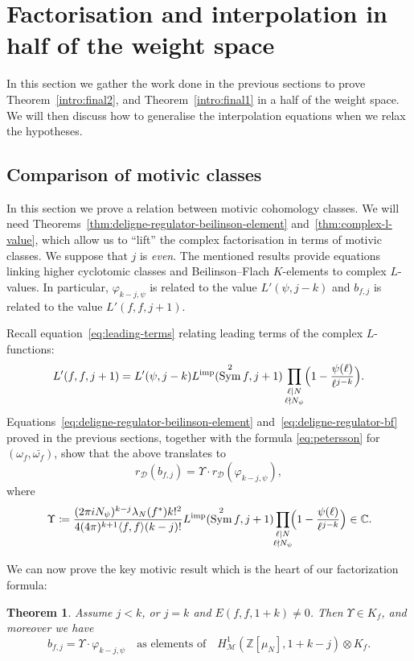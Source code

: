 \documentclass[11pt, a4paper, reqno]{amsart}
\theoremstyle{definition}
\theoremstyle{plain}
\newtheorem{theorem}[definition]{Theorem}
\theoremstyle{remark}
\DeclareMathOperator{\Sym}{Sym}
\DeclareMathOperator{\mot}{\mathscr{M}}
\newcommand{\numberset}{\mathbb}
\newcommand{\C}{\numberset{C}}
\newcommand{\Z}{\numberset{Z}}
\renewcommand{\phi}{\varphi}
\newcommand{\del}{\mathcal{D}}
\newcommand{\regulator}[1]{r_{#1}}
\newcommand{\rD}{\regulator{\del}}
\newcommand{\Limp}{L^{\mathrm{imp}}}
\begin{document}
\section{Factorisation and interpolation in half of the weight space}
 \label{sec:comparison}
 
 In this section we gather the work done in the previous sections to prove Theorem~\ref{intro:final2}, and Theorem~\ref{intro:final1} in a half of the weight space. We will then discuss how to generalise the interpolation equations when we relax the hypotheses.

 \subsection{Comparison of motivic classes}

  In this section we prove a relation between motivic cohomology classes. We will need Theorems~\ref{thm:deligne-regulator-beilinson-element} and~\ref{thm:complex-l-value}, which allow us to ``lift'' the complex factorisation in terms of motivic classes. We suppose that $j$ is \emph{even}. The mentioned results provide equations linking higher cyclotomic classes and Beilinson--Flach $K$-elements to complex $L$-values. In particular, $\phi_{k-j, \psi}$ is related to the value $L'(\psi,j-k)$ and $b_{f, j}$ is related to the value $L'(f,f,j+1)$.

  Recall equation~\eqref{eq:leading-terms} relating leading terms of the complex $L$-functions:
  \[
   L'(f,f,j+1) = L'(\psi,j-k)\Limp(\Sym^2 f,j+1)
   \prod_{\substack{\ell \mid N \\ \ell \nmid N_{\psi}}} \Bigl(1 - \frac{\psi(\ell)}{\ell^{j-k}} \Bigr).
  \]
  Equations~\eqref{eq:deligne-regulator-beilinson-element} and~\eqref{eq:deligne-regulator-bf} proved in the previous sections, together with the formula \eqref{eq:petersson} for $(\omega_f, \bar{\omega_f})$, show that the above translates to
  \[ \rD(b_{f, j}) = \Upsilon \cdot \rD(\phi_{k-j, \psi}), \]
  where
  \[ 
   \Upsilon \coloneqq  \frac{(2\pi i N_\psi)^{k-j} \lambda_N(f^*) k!^2}{4 (4\pi)^{k+1} \langle f, f \rangle (k-j)!}\Limp(\Sym^2 f,j+1)\smashoperator{\prod_{\substack{\ell \mid N \\ \ell \nmid N_{\psi}}}} \Bigl(1 - \frac{\psi(\ell)}{\ell^{j-k}}\Bigr) \in \C.
  \]
 
  We can now prove the key motivic result which is the heart of our factorization formula:
  \begin{theorem}
   \label{thm:motivic-relation}
   Assume $j < k$, or $j = k$ and $E(f, f, 1 + k) \ne 0$. Then $\Upsilon \in K_f$, and moreover we have
   \[ b_{f, j} = \Upsilon \cdot \phi_{k-j, \psi}\quad \text{as elements of}\quad H^1_{\mot}(\Z[\mu_N], 1 + k - j) \otimes K_f.\]
  \end{theorem}
  
\end{document}
